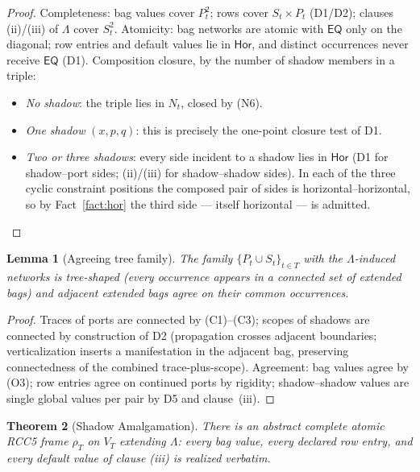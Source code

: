 \documentclass[11pt]{article}
\newtheorem{theorem}{Theorem}[section]
\newtheorem{lemma}[theorem]{Lemma}
\theoremstyle{definition}
\newcommand{\EQ}{\mathsf{EQ}}
\newcommand{\Hor}{\mathsf{Hor}}
\begin{document}
\begin{proof}
Completeness: bag values cover $P_t^2$; rows cover $S_t\times P_t$
(D1/D2); clauses (ii)/(iii) of $\Lambda$ cover $S_t^2$.  Atomicity: bag
networks are atomic with $\EQ$ only on the diagonal; row entries and
default values lie in $\Hor$, and distinct occurrences never receive
$\EQ$ (D1).  Composition closure, by the number of shadow members in a
triple:
\begin{itemize}[leftmargin=2em]
\item \emph{No shadow}: the triple lies in $N_t$, closed by (N6).
\item \emph{One shadow} $(x,p,q)$: this is precisely the one-point
closure test of D1.
\item \emph{Two or three shadows}: every side incident to a shadow lies
in $\Hor$ (D1 for shadow--port sides; (ii)/(iii) for shadow--shadow
sides).  In each of the three cyclic constraint positions the composed
pair of sides is horizontal--horizontal, so by Fact~\ref{fact:hor} the
third side --- itself horizontal --- is admitted.\qedhere
\end{itemize}
\end{proof}

\begin{lemma}[Agreeing tree family]\label{lem:ext-family}
The family $\{P_t\cup S_t\}_{t\in T}$ with the $\Lambda$-induced networks
is tree-shaped (every occurrence appears in a connected set of extended
bags) and adjacent extended bags agree on their common occurrences.
\end{lemma}

\begin{proof}
Traces of ports are connected by (C1)--(C3); scopes of shadows are
connected by construction of D2 (propagation crosses adjacent boundaries;
verticalization inserts a manifestation in the adjacent bag, preserving
connectedness of the combined trace-plus-scope).  Agreement: bag values
agree by (O3); row entries agree on continued ports by rigidity;
shadow--shadow values are single global values per pair by D5 and
clause~(iii).
\end{proof}

\begin{theorem}[Shadow Amalgamation]\label{thm:sal}
There is an abstract complete atomic RCC5 frame $\rho_T$ on $V_T$
extending $\Lambda$: every bag value, every declared row entry, and every
default value of clause (iii) is realized verbatim.
\end{theorem}
\end{document}
